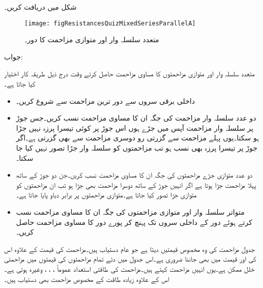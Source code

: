 شکل  میں  دریافت کریں۔
\begin{figure}
\centering
\texttt{[image: figResistancesQuizMixedSeriesParallelA]}
\caption{متعدد سلسلہ وار اور متوازی مزاحمت کا  دور۔}
\label{شکل_مزاحمتی_مشق_متعدد_مزاحمت}
\end{figure}

جواب:

متعدد سلسلہ وار اور متوازی مزاحمتوں کا مساوی مزاحمت حاصل کرتے وقت درج ذیل طریقہ کار اختیار کیا جاتا ہے۔
\begin{itemize}
\item
داخلی برقی سروں سے دور ترین  مزاحمت سے شروع کریں۔
\item
دو عدد سلسلہ وار مزاحمت کی جگہ ان کا مساوی مزاحمت  نسب کریں۔جس جوڑ پر سلسلہ وار مزاحمت آپس میں جڑے ہوں اس جوڑ پر کوئی تیسرا پرزہ نہیں جڑا ہو سکتا۔یوں پہلے مزاحمت سے گزرتی رو دوسری مزاحمت سے بھی گزرتی ہے۔اگر جوڑ پر تیسرا پرزہ بھی نسب ہو تب مزاحمتوں کو سلسلہ وار جڑا تصور نہیں کیا جا سکتا۔
\item
دو عدد متوازی جڑے مزاحمتوں کی جگہ ان کا مساوی مزاحمت  نسب کریں۔جن دو جوڑ کے ساتھ پہلا مزاحمت جڑا ہوتا ہے اگر انہیں جوڑ کے ساتھ دوسرا مزاحمت بھی جڑا ہو تب ان مزاحمتوں کو متوازی جڑا تصور کیا جاتا ہے۔متوازی مزاحمتوں پر برابر دباو پایا جاتا ہے۔
\item
متواتر سلسلہ وار اور متوازی مزاحمتوں کی جگہ ان کا مساوی مزاحمت نسب کرتے ہوئے دور کے داخلی سروں تک پہنچ کر پورے دور کا مساوی مزاحمت حاصل کریں۔
\end{itemize}

جدول  مزاحمت کی وہ مخصوص  قیمتیں دیتا ہے جو عام دستیاب ہیں۔مزاحمت کی قیمت کے علاوہ اس کی  اور قیمت میں  بھی جاننا ضروری ہے۔اس جدول میں دئے تمام مزاحمتوں کی قیمتوں میں  مزاحمتی خلل ممکن ہے۔یوں انہیں  مزاحمت کہتے ہیں۔مزاحمت کی طاقتی استعداد عموماً ، ، ،  وغیرہ ہوتی ہے۔اس کے علاوہ زیادہ طاقت کے  مخصوص مزاحمت بھی دستیاب ہیں۔

